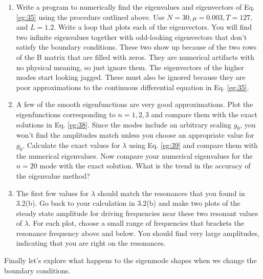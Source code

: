 \documentclass{book}
\theoremstyle{plain}
\theoremstyle{definition}
\numberwithin{exm}{chapter}
\theoremstyle{remark}
\theoremstyle{summary}
\theoremstyle{overview}
\begin{document}
	\begin{enumerate}[label=(\alph*)]
	\item  Write a program to numerically find the eigenvalues and eigenvectors
of Eq. \eqref{eg:35} using the procedure outlined above. Use $N = 30, \mu = 0.003,
T = 127,$ and $L = 1.2$. Write a loop that plots each of the eigenvectors.
You will find two infinite eigenvalues together with odd-looking eigenvectors that don\rq t satisfy the boundary conditions. These two show up
because of the two rows of the B matrix that are filled with zeros. They
are numerical artifacts with no physical meaning, so just ignore them.
The eigenvectors of the higher modes start looking jagged. These
must also be ignored because they are poor approximations to the
continuous differential equation in Eq. \eqref{eg:35}.
	\item A few of the smooth eigenfunctions are very good approximations.
Plot the eigenfunctions corresponding to $n = 1,2,3$ and compare them
with the exact solutions in Eq. \eqref{eg:38}. Since the modes include an
arbitrary scaling $g_0$, you won\rq t find the amplitudes match unless you
choose an appropriate value for $g_0$. Calculate the exact values for $\lambda$
using Eq. \eqref{eg:39} and compare them with the numerical eigenvalues.
Now compare your numerical eigenvalues for the $n = 20$ mode with
the exact solution. What is the trend in the accuracy of the eigenvalue
method?
	\item The first few values for $\lambda$ should match the resonances that you found
in 3.2(b). Go back to your calculation in 3.2(b) and make two plots
of the steady state amplitude for driving frequencies near these two
resonant values of $\lambda$. For each plot, choose a small range of frequencies that brackets the resonance frequency above and below. You
should find very large amplitudes, indicating that you are right on the
resonances.
	\end{enumerate}
	Finally let\rq s explore what happens to the eigenmode shapes when we change
the boundary conditions.
\end{document}
